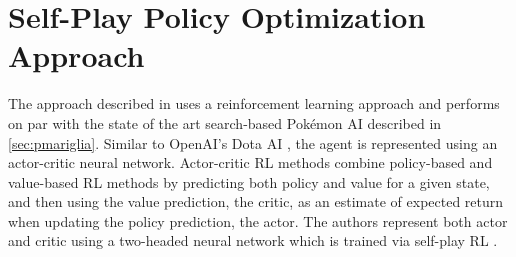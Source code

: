 \section{Self-Play Policy Optimization Approach}
The approach described in \cite{Huang_Lee_2019} uses a reinforcement learning approach and performs 
on par with the state of the art search-based Pokémon AI described in \ref{sec:pmariglia}. Similar to
OpenAI's Dota AI \cite{OpenAI_dota}, the agent is represented using an actor-critic neural network.
Actor-critic RL methods \cite{Konda_Tsitsiklis}
combine policy-based and value-based RL methods by predicting both policy and value for a given 
state, and then using the value prediction, the \glqq critic\grqq, as an estimate of expected
return when updating the policy prediction, the \glqq actor\grqq. The authors represent both
actor and critic using a two-headed neural network which is trained via self-play RL
\cite{Huang_Lee_2019}.

